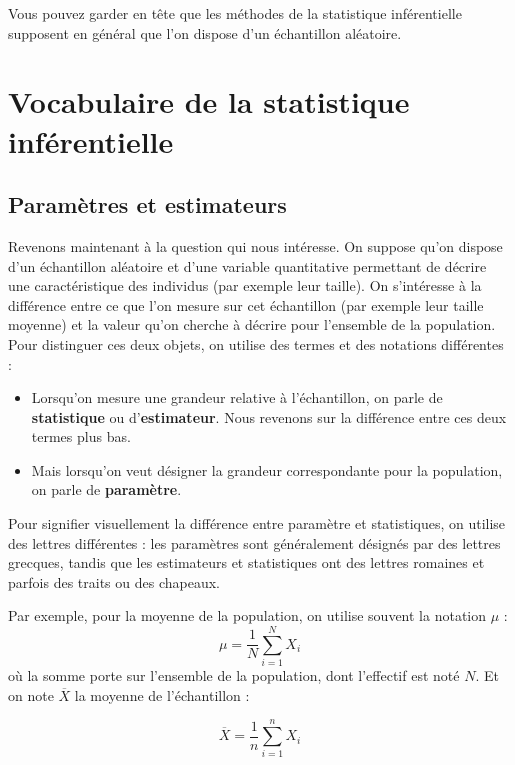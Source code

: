 \documentclass[
  french,
]{book}
\providecommand{\tightlist}{%
  \setlength{\itemsep}{0pt}\setlength{\parskip}{0pt}}
\begin{document}
Vous pouvez garder en tête que les méthodes de la statistique inférentielle supposent en général que l'on dispose d'un échantillon aléatoire.

\hypertarget{vocabulaire-de-la-statistique-infuxe9rentielle}{%
\section{Vocabulaire de la statistique inférentielle}\label{vocabulaire-de-la-statistique-infuxe9rentielle}}

\hypertarget{paramuxe8tres-et-estimateurs}{%
\subsection{Paramètres et estimateurs}\label{paramuxe8tres-et-estimateurs}}

Revenons maintenant à la question qui nous intéresse. On suppose qu'on dispose d'un échantillon aléatoire et d'une variable quantitative permettant de décrire une caractéristique des individus (par exemple leur taille). On s'intéresse à la différence entre ce que l'on mesure sur cet échantillon (par exemple leur taille moyenne) et la valeur qu'on cherche à décrire pour l'ensemble de la population. Pour distinguer ces deux objets, on utilise des termes et des notations différentes :

\begin{itemize}
\tightlist
\item
  Lorsqu'on mesure une grandeur relative à l'échantillon, on parle de \textbf{statistique} ou d'\textbf{estimateur}. Nous revenons sur la différence entre ces deux termes plus bas.
\item
  Mais lorsqu'on veut désigner la grandeur correspondante pour la population, on parle de \textbf{paramètre}.
\end{itemize}

Pour signifier visuellement la différence entre paramètre et statistiques, on utilise des lettres différentes : les paramètres sont généralement désignés par des lettres grecques, tandis que les estimateurs et statistiques ont des lettres romaines et parfois des traits ou des chapeaux.

Par exemple, pour la moyenne de la population, on utilise souvent la notation \(\mu\) : \[ \mu  = \frac{1}{N} \sum_{i=1}^{N} X_i \] où la somme porte sur l'ensemble de la population, dont l'effectif est noté \(N\). Et on note \(\overline{X}\) la moyenne de l'échantillon :

\[ \overline{X} = \frac{1}{n} \sum_{i=1}^{n} X_i\]
\end{document}

